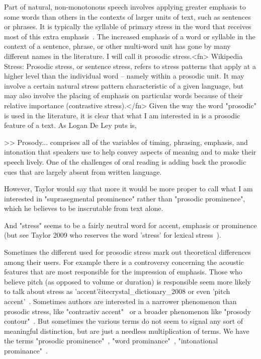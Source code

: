 \documentclass[12pt]{proposal}
\begin{document}
Part of natural, non-monotonous speech involves applying greater emphasis to some words than others in the contexts of larger units of text, such as sentences or phrases.
It is typically the syllable of primary stress in the word that receives most of this extra emphasis~\cite{jurafsky_speech_2009}.
The increased emphasis of a word or syllable in the context of a sentence, phrase, or other multi-word unit has gone by many different names in the literature.
I will call it prosodic stress.<fn> Wikipedia Stress: Prosodic stress, or sentence stress, refers to stress patterns that apply at a higher level than the individual word – namely within a prosodic unit.
It may involve a certain natural stress pattern characteristic of a given language, but may also involve the placing of emphasis on particular words because of their relative importance (contrastive stress).</fn>  Given the way the word "prosodic" is used in the literature, it is clear that what I am interested in is a prosodic feature of a text.
As Logan De Ley puts is,

>> Prosody...
comprises all of the variables of timing, phrasing, emphasis, and intonation that speakers use to help convey aspects of meaning and to make their speech lively.
One of the challenges of oral reading is adding back the prosodic cues that are largely absent from written language.~\cite{de_ley_why_2012}

However, Taylor would say that more it would be more proper to call what I am interested in "suprasegmental prominence" rather than "prosodic prominence", which he believes to be inscrutable from text alone.

And "stress" seems to be a fairly neutral word for accent, emphasis or prominence (but see Taylor 2009 who reserves the word 'stress' for lexical stress~\cite[p.117]{taylor_text--speech_2009}).

Sometimes the different used for prosodic stress mark out theoretical differences among their users.
For example there is a controversy concerning the acoustic features that are most responsible for the impression of emphasis.
Those who believe pitch (as opposed to volume or duration) is responsible seem more likely to talk about stress as 'accent'\~cite{crystal_dictionary_2008} or even 'pitch accent'~\cite{brenier_automatic_2008, hirschberg_pitch_1993}.
Sometimes authors are interested in a narrower phenomenon than prosodic stress, like "contrastiv accent"~\cite{theune_contrastive_1997} or a broader phenomenon like "prosody contour"~\cite{fernandez_prosody_2014}.
But sometimes the various terms do not seem to signal any sort of meaningful distinction, but are just a needless multiplication of terms.
We have the terms "prosodic prominence"~\cite{jurafsky_speech_2009}, "word prominance"~\cite{widera_prediction_1997}, "intonational prominance"~\cite{nakatani_computational_1997}.
\end{document}
